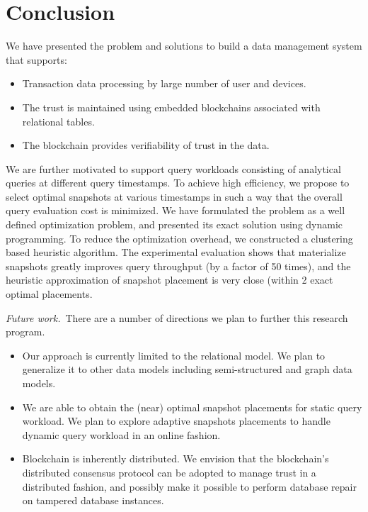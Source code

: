 \section{Conclusion}

We have presented the problem and solutions to build a data management system
that supports:

\begin{itemize}
\item Transaction data processing by large number of user and devices.
\item The trust is maintained using embedded blockchains associated with
relational tables.
\item The blockchain provides verifiability of trust in the data.
\end{itemize}

We are further motivated to support query workloads consisting of analytical
queries at different query timestamps.  To achieve high efficiency, we propose
to select optimal snapshots at various timestamps in such a way that the overall
query evaluation cost is minimized.  We have formulated the problem as a well
defined optimization problem, and presented its exact solution using dynamic
programming.  To reduce the optimization overhead, we constructed a clustering
based heuristic algorithm.  The experimental evaluation shows that materialize
snapshots greatly improves query throughput (by a factor of 50 times), and the
heuristic approximation of snapshot placement is very close (within 2%
exact optimal placements.

\medskip

{\em Future work.}\ There are a number of directions we plan to further this
research program.

\begin{itemize}
\item Our approach is currently limited to the relational model.  We plan to
generalize it to other data models including semi-structured and graph data
models.
\item We are able to obtain the (near) optimal snapshot placements for static
query workload.  We plan to explore adaptive snapshots placements to handle
dynamic query workload in an online fashion.
\item Blockchain is inherently distributed.  We envision that the blockchain's
distributed consensus protocol can be adopted to manage trust in a distributed
fashion, and possibly make it possible to perform database repair on tampered
database instances.
\end{itemize}
